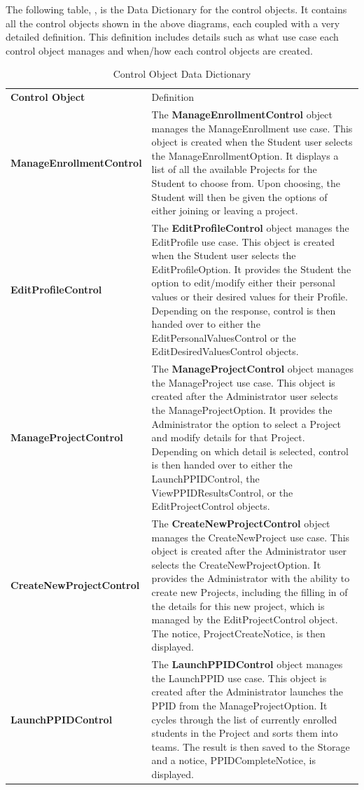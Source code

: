 \documentclass[12pt,letterpaper]{article}
\begin{document}
The following table, , is the Data Dictionary for the control objects. It contains all the control objects shown in the above diagrams, each coupled with a very detailed definition. 
This definition includes details such as what use case each control object manages and when/how each control objects are created.

\begin{table}[H]
\caption{Control Object Data Dictionary}
	\begin{tabu} to 
		\tableheader{}Control Object & Definition\\
		ManageEnrollmentControl & 
			The {\bf ManageEnrollmentControl} object manages the ManageEnrollment use case. This object is created when the Student user
			selects the ManageEnrollmentOption.  It displays a list of all the available Projects for the Student to choose from. Upon choosing, the
			Student will then be given the options of either joining or leaving a project. \\
		EditProfileControl & 
			The {\bf EditProfileControl} object manages the EditProfile use case. This object is created when the Student user selects the EditProfileOption.
			It provides the Student the option to edit/modify either their personal values or their desired values for their Profile. Depending on the response, control is then
			handed over to either the EditPersonalValuesControl or the EditDesiredValuesControl objects. \\
		ManageProjectControl & 
			The {\bf ManageProjectControl} object manages the ManageProject use case. This object is created after the Administrator user selects the
			ManageProjectOption. It provides the Administrator the option to select a Project and modify details for that Project. Depending on which detail
			is selected, control is then handed over to either the LaunchPPIDControl, the ViewPPIDResultsControl, or the EditProjectControl objects.\\
		CreateNewProjectControl & 
			The {\bf CreateNewProjectControl} object manages the CreateNewProject use case. This object is created after the Administrator user selects the
			CreateNewProjectOption. It provides the Administrator with the ability to create new Projects, including the filling in of the details for this new project,
			which is managed by the EditProjectControl object. The notice, ProjectCreateNotice, is then displayed.\\
		LaunchPPIDControl & 
			The {\bf LaunchPPIDControl} object manages the LaunchPPID use case. This object is created after the Administrator launches the PPID from
			the ManageProjectOption. It cycles through the list of currently enrolled students in the Project and sorts them into teams. The result is then saved
			to the Storage and a notice, PPIDCompleteNotice, is displayed.\\
	\end{tabu}
\end{table}
\end{document}
